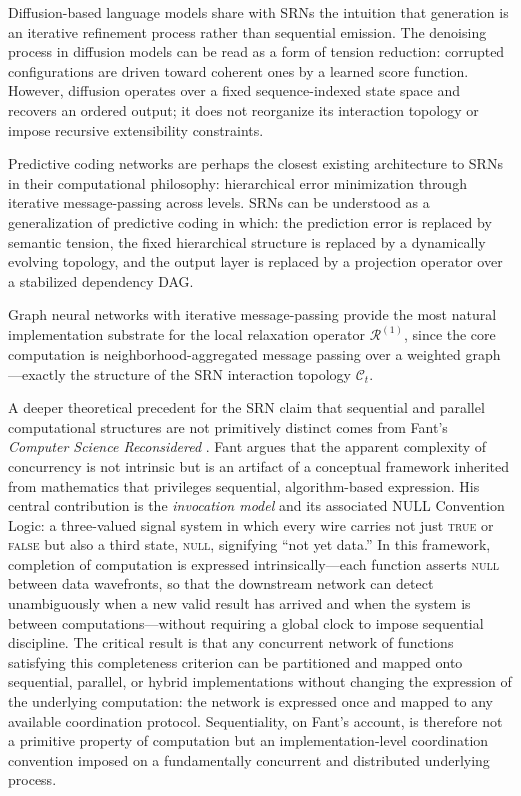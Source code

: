 \documentclass[11pt, a4paper]{article}
\theoremstyle{srn}
\theoremstyle{srnremark}
\newcommand{\Cstruct}{\mathcal{C}}           %
\newcommand{\Rop}{\mathcal{R}}           %
\begin{document}
Diffusion-based language models \citep{ho2020ddpm, austin2021discrete}
share with SRNs the intuition that generation is an iterative
refinement process rather than sequential emission.
The denoising process in diffusion models can be read as a form of
tension reduction: corrupted configurations are driven toward coherent
ones by a learned score function.
However, diffusion operates over a fixed sequence-indexed state space
and recovers an ordered output; it does not reorganize its interaction
topology or impose recursive extensibility constraints.

Predictive coding networks \citep{friston2010free, friston2006free}
are perhaps the closest existing architecture to SRNs in their
computational philosophy: hierarchical error minimization through
iterative message-passing across levels.
SRNs can be understood as a generalization of predictive coding in
which: the prediction error is replaced by semantic tension, the
fixed hierarchical structure is replaced by a dynamically evolving
topology, and the output layer is replaced by a projection operator
over a stabilized dependency DAG.

Graph neural networks with iterative message-passing
\citep{goodfellow2016deep} provide the most natural implementation
substrate for the local relaxation operator $\Rop^{(1)}$, since the
core computation is neighborhood-aggregated message passing over a
weighted graph---exactly the structure of the SRN interaction topology
$\Cstruct_t$.


A deeper theoretical precedent for the SRN claim that sequential and
parallel computational structures are not primitively distinct comes
from Fant's \emph{Computer Science Reconsidered}
\citep{fant2007computer}.
Fant argues that the apparent complexity of concurrency is not
intrinsic but is an artifact of a conceptual framework inherited from
mathematics that privileges sequential, algorithm-based expression.
His central contribution is the \emph{invocation model} and its
associated NULL Convention Logic: a three-valued signal system in
which every wire carries not just \textsc{true} or \textsc{false}
but also a third state, \textsc{null}, signifying ``not yet data.''
In this framework, completion of computation is expressed
intrinsically---each function asserts \textsc{null} between data
wavefronts, so that the downstream network can detect unambiguously
when a new valid result has arrived and when the system is between
computations---without requiring a global clock to impose sequential
discipline.
The critical result is that any concurrent network of functions
satisfying this completeness criterion can be partitioned and mapped
onto sequential, parallel, or hybrid implementations without changing
the expression of the underlying computation: the network is
expressed once and mapped to any available coordination protocol.
Sequentiality, on Fant's account, is therefore not a primitive
property of computation but an implementation-level coordination
convention imposed on a fundamentally concurrent and distributed
underlying process.
\end{document}
